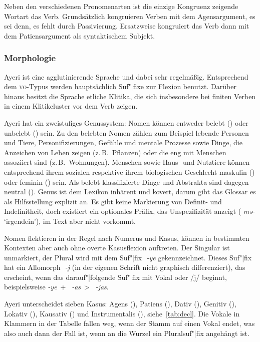 \documentclass[
	12pt,
	ngerman,
]{scrartcl}
\newcommand{\zwsp}{\mbox{​}} %
\newcommand{\rayr}[2]{\zwsp\smash{{\Tagati #1}} \emph{#2}} %
\newcommand{\xayr}[3]{\zwsp\smash{\Tagati #1} \emph{#2} `#3'} %
\begin{document}
Neben den verschiedenen Pronomenarten ist die einzige Kongruenz zeigende
Wortart das Verb. Grundsätzlich kongruieren Verben mit dem Agensargument, es
sei denn, es fehlt durch
Passivierung. Ersatzweise kongruiert das Verb dann mit dem Patiensargument als
syntaktischem Subjekt.

\subsubsection{Morphologie}

Ayeri ist eine agglutinierende Sprache und dabei sehr regelmäßig. Entsprechend
dem \textsc{vo}-Typus werden hauptsächlich Suf"|fixe zur Flexion benutzt.
Darüber hinaus besitzt die Sprache etliche Klitika, die sich insbesondere bei
finiten Verben in einem Klitikcluster vor dem Verb zeigen.

\label{subsubsec:nom}

Ayeri hat ein zweistufiges Genussystem: Nomen können entweder belebt (\Anim)
oder unbelebt (\Inan) sein. Zu den belebten Nomen zählen zum Beispiel lebende
Personen und Tiere, Personifizierungen, Gefühle und mentale Prozesse sowie
Dinge, die Anzeichen von Leben zeigen (z.\,B.~Pflanzen) oder die eng mit
Menschen assoziiert sind (z.\,B.~Wohnungen). Menschen sowie Haus- und Nutztiere
können entsprechend ihrem sozialen respektive ihrem biologischen Geschlecht
maskulin (\M) oder feminin (\F) sein. Als belebt klassifizierte Dinge und
Abstrakta sind dagegen neutral (\N). Genus ist dem Lexikon inhärent und kovert,
darum gibt das Glossar es als Hilfsstellung explizit an. Es gibt keine
Markierung von Definit- und Indefinitheit, doch existiert ein optionales Präfix,
das Unspezifizität anzeigt (\xayr{me/}{mə-}{irgendein}), im Text aber nicht
vorkommt.

Nomen flektieren in der Regel nach Numerus und Kasus, können in bestimmten
Kontexten aber auch ohne overte Kasusflexion auftreten. Der Singular ist
unmarkiert, der Plural wird mit dem Suf"|fix \rayr{/ye}{-ye} gekennzeichnet.
Dieses Suf"|fix hat ein Allomorph \rayr{/ye}{-j} (in der eigenen Schrift nicht
graphisch differenziert), das erscheint, wenn das darauf"|folgende Suf"|fix mit
Vokal oder /j/ beginnt, beispielsweise
\rayr{/ye}{-ye}~+~\rayr{/AsF}{-as}~>~\rayr{/ye\_asF}{-jas}.

Ayeri unterscheidet sieben Kasus: Agens (\Aarg), Patiens (\Parg), Dativ (\Dat),
Genitiv (\Gen), Lokativ (\Loc), Kausativ (\Caus) und Instrumentalis (\Ins),
siehe~\cref{tab:decl}. Die Vokale in Klammern in der Tabelle fallen weg, wenn
der Stamm auf einen Vokal endet, was also auch dann der Fall ist, wenn an die
Wurzel ein Pluralsuf"|fix angehängt ist.
\end{document}
